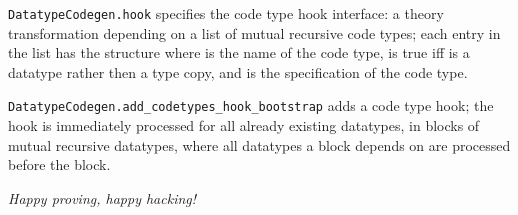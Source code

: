 \begin{isabellebody}
\begin{isamarkuptext}
\begin{description}
  \item \verb|DatatypeCodegen.hook| specifies the code type hook
     interface: a theory transformation depending on a list of
     mutual recursive code types; each entry in the list
     has the structure 
     where  is the name of the code type, 
     is true iff  is a datatype rather then a type copy,
     and  is the specification of the code type.

  \item \verb|DatatypeCodegen.add_codetypes_hook_bootstrap| adds a code
     type hook;  the hook is immediately processed for all already
     existing datatypes, in blocks of mutual recursive datatypes,
     where all datatypes a block depends on are processed before
     the block.

  \end{description}

  \emph{Happy proving, happy hacking!}%
\end{isamarkuptext}%
\isamarkuptrue%
%
\isadelimtheory
%
\endisadelimtheory
%
\isatagtheory
{}\isamarkupfalse%
%
\endisatagtheory
{\isafoldtheory}%
%
\isadelimtheory
%
\endisadelimtheory
\isanewline
\end{isabellebody}%
